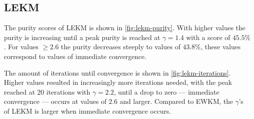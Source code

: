\documentclass[../report.tex]{subfiles}
\begin{document}



\subsection{LEKM}
The purity scores of LEKM is shown in \cref{fig:lekm-purity}. With higher values the purity is increasing until a peak purity is reached at $\gamma = 1.4$ with a score of $45.5\%$. For values $\geq 2.6$ the purity decreases steeply to values of $43.8\%$, these values correspond to values of immediate convergence.

The amount of iterations until convergence is shown in \cref{fig:lekm-iterations}. Higher values resulted in increasingly more iterations needed, with the peak reached at 20 iterations with $\gamma=2.2$, until a drop to zero --- immediate convergence ---  occurs at values of $2.6$ and larger. Compared to EWKM, the $\gamma$'s of LEKM is larger when immediate convergence occurs.


\end{document}
